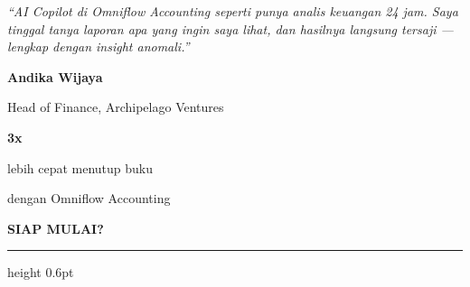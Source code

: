\documentclass[a4paper]{article}
\newcommand{\sectiontitle}[1]{%
    \vspace{10pt}%
    {\fontsize{13}{16}\selectfont\bfseries\color{BlueDark} #1}\par\vspace{3pt}%
    {\color{BluePrimary}\hrule height 0.6pt}\par\vspace{8pt}%
}
\begin{document}
\noindent
\begin{minipage}[t]{0.485\textwidth}
    \colorbox{BlueBg}{%
        \begin{minipage}{\dimexpr\linewidth-2\fboxsep\relax}
            \vspace{6pt}
            {\fontsize{9.5}{13}\selectfont\color{TextDark}\textit{``AI Copilot di Omniflow Accounting seperti punya analis keuangan 24 jam. Saya tinggal tanya laporan apa yang ingin saya lihat, dan hasilnya langsung tersaji — lengkap dengan insight anomali.''}}%
            \par\vspace{4pt}
            {\fontsize{8.5}{11}\selectfont\bfseries\color{BluePrimary} Andika Wijaya}\par
            {\fontsize{8}{10}\selectfont\color{TextLight} Head of Finance, Archipelago Ventures}
            \vspace{6pt}
        \end{minipage}}
\end{minipage}%
\hfill
\begin{minipage}[t]{0.485\textwidth}
    \colorbox{BlueBg}{%
        \begin{minipage}{\dimexpr\linewidth-2\fboxsep\relax}
            \vspace{6pt}
            \begin{center}
                {\fontsize{20}{24}\selectfont\bfseries\color{BluePrimary} 3x}\par
                {\fontsize{9.5}{12}\selectfont\color{TextDark} lebih cepat menutup buku}\par
                {\fontsize{9.5}{12}\selectfont\color{TextDark} dengan Omniflow Accounting}
            \end{center}
            \vspace{6pt}
        \end{minipage}}
\end{minipage}

\sectiontitle{SIAP MULAI?}
\end{document}
